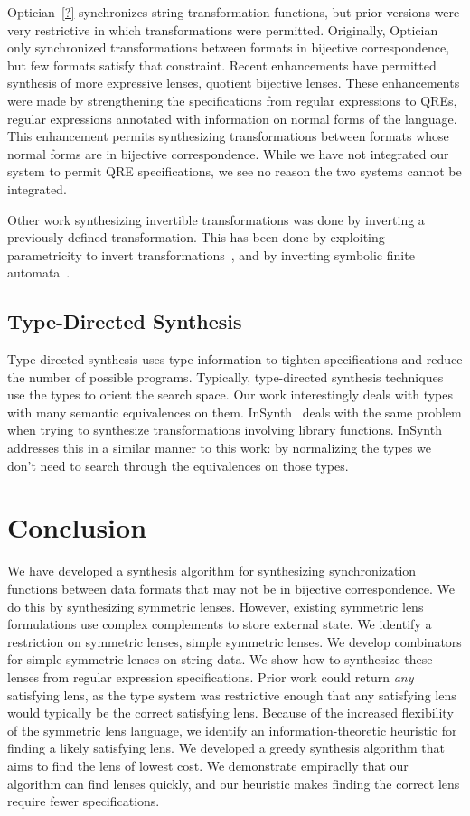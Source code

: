 \documentclass[acmsmall,screen,anonymous]{acmart}
\begin{document}
Optician~\ref{?} synchronizes string transformation functions, but prior
versions were very restrictive in which transformations were permitted.
Originally, Optician only synchronized transformations between formats in
bijective correspondence, but few formats satisfy that constraint. Recent
enhancements have permitted synthesis of more expressive lenses, quotient
bijective lenses. These enhancements were made by strengthening the
specifications from regular expressions to QREs, regular expressions annotated
with information on normal forms of the language. This enhancement permits
synthesizing transformations between formats whose normal forms are in bijective
correspondence. While we have not integrated our system to permit QRE
specifications, we see no reason the two systems cannot be integrated.

Other work synthesizing invertible transformations was done by inverting a
previously defined transformation.  This has been done by exploiting
parametricity to invert transformations~\cite{?}, and by inverting symbolic
finite automata~\cite{?}.

\subsection{Type-Directed Synthesis}

Type-directed synthesis uses type information to tighten specifications and
reduce the number of possible programs. Typically, type-directed synthesis
techniques use the types to orient the search space.  Our work interestingly
deals with types with many semantic equivalences on them. InSynth~\cite{?}
deals with the same problem when trying to synthesize transformations involving
library functions. InSynth addresses this in a similar manner to this work: by
normalizing the types we don't need to search through the equivalences on those
types.


\section{Conclusion}
\label{sec:conc}
We have developed a synthesis algorithm for synthesizing synchronization
functions between data formats that may not be in bijective correspondence. We
do this by synthesizing symmetric lenses. However, existing symmetric lens
formulations use complex complements to store external state. We identify a
restriction on symmetric lenses, simple symmetric lenses. We develop combinators
for simple symmetric lenses on string data. We show how to synthesize these
lenses from regular expression specifications. Prior work could return
\emph{any} satisfying lens, as the type system was restrictive enough that any
satisfying lens would typically be the correct satisfying lens. Because of the
increased flexibility of the symmetric lens language, we identify an
information-theoretic heuristic for finding a likely satisfying lens. We
developed a greedy synthesis algorithm that aims to find the lens of lowest
cost. We demonstrate empiraclly that our algorithm can find lenses quickly, and
our heuristic makes finding the correct lens require fewer specifications.
\end{document}
